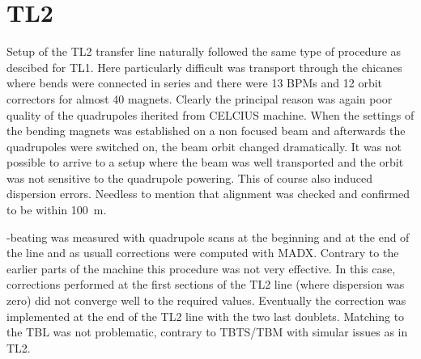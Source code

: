 \section{TL2}

Setup of the \ac{TL2} transfer line naturally followed the same 
type of procedure as descibed for \ac{TL1}.
Here particularly difficult was transport through the chicanes
where bends were connected in series and
there were 13 BPMs and 12 orbit correctors for almost 40 magnets.
Clearly the principal reason was again poor quality of the quadrupoles
iherited from CELCIUS machine.
When the settings of the bending magnets was established on a non focused beam
and afterwards the quadrupoles were switched on, the beam orbit changed dramatically.
It was not possible to arrive to a setup where the beam was well transported
and the orbit was not sensitive to the quadrupole powering.
This of course also induced dispersion errors.
Needless to mention that alignment was checked and confirmed to be within 100~\textmu m.

\textbeta-beating was measured with quadrupole scans at the beginning and at the end of the line
and as usuall corrections were computed with MADX. 
Contrary to the earlier parts of the machine this procedure was not very effective.
In this case, corrections performed at the first sections of the TL2 line 
(where dispersion was zero) did not converge well to the required values. 
Eventually the correction was implemented at the end of the TL2 line
with the two last doublets.
Matching to the TBL was not problematic, contrary to TBTS/TBM with 
simular issues as in TL2.







